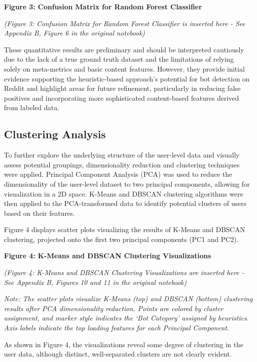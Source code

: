 \documentclass[
  12pt,
  letterpaper,
  DIV=11,
  numbers=noendperiod]{scrartcl}
\begin{document}
\textbf{Figure 3: Confusion Matrix for Random Forest Classifier}

\emph{(Figure 3: Confusion Matrix for Random Forest Classifier is
inserted here - See Appendix B, Figure 6 in the original notebook)}

These quantitative results are preliminary and should be interpreted
cautiously due to the lack of a true ground truth dataset and the
limitations of relying solely on meta-metrics and basic content
features. However, they provide initial evidence supporting the
heuristic-based approach's potential for bot detection on Reddit and
highlight areas for future refinement, particularly in reducing false
positives and incorporating more sophisticated content-based features
derived from labeled data.

\subsection{Clustering Analysis}\label{clustering-analysis}

To further explore the underlying structure of the user-level data and
visually assess potential groupings, dimensionality reduction and
clustering techniques were applied. Principal Component Analysis (PCA)
was used to reduce the dimensionality of the user-level dataset to two
principal components, allowing for visualization in a 2D space. K-Means
and DBSCAN clustering algorithms were then applied to the
PCA-transformed data to identify potential clusters of users based on
their features.

Figure 4 displays scatter plots visualizing the results of K-Means and
DBSCAN clustering, projected onto the first two principal components
(PC1 and PC2).

\textbf{Figure 4: K-Means and DBSCAN Clustering Visualizations}

\emph{(Figure 4: K-Means and DBSCAN Clustering Visualizations are
inserted here - See Appendix B, Figures 10 and 11 in the original
notebook)}

\emph{Note: The scatter plots visualize K-Means (top) and DBSCAN
(bottom) clustering results after PCA dimensionality reduction. Points
are colored by cluster assignment, and marker style indicates the `Bot
Category' assigned by heuristics. Axis labels indicate the top loading
features for each Principal Component.}

As shown in Figure 4, the visualizations reveal some degree of
clustering in the user data, although distinct, well-separated clusters
are not clearly evident.
\end{document}
